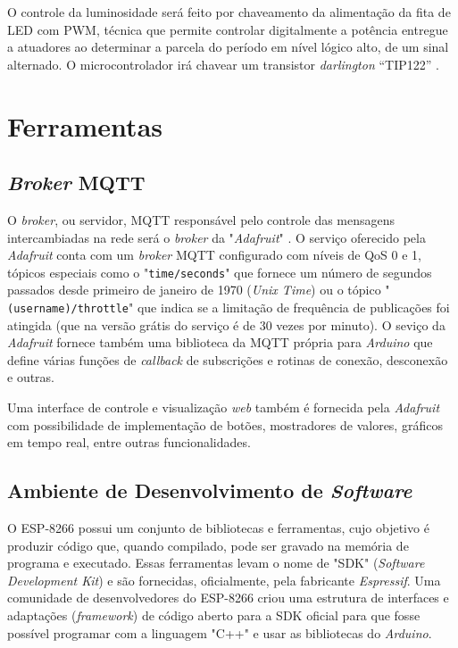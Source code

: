 O controle da luminosidade será feito por chaveamento da alimentação da fita de LED com \acf{PWM}, técnica que permite controlar digitalmente a potência entregue a atuadores ao determinar a parcela do período em nível lógico alto, de um sinal alternado. O microcontrolador irá chavear um transistor \textit{darlington} “TIP122” \cite{tip122}.

\section{Ferramentas}

\subsection{\textit{Broker} MQTT}

O \textit{broker}, ou servidor, MQTT responsável pelo controle das mensagens intercambiadas na rede será o \textit{broker} da "\textit{Adafruit}" \cite{adafruit}. O serviço oferecido pela \textit{Adafruit} conta com um  \textit{broker} MQTT configurado com níveis de QoS 0 e 1, tópicos especiais como o "\texttt{time/seconds}" que fornece um número de segundos passados desde primeiro de janeiro de 1970 (\textit{Unix Time}) ou o tópico "\texttt{(username)/throttle}" que indica se a limitação de frequência de publicações foi atingida (que na versão grátis do serviço é de 30 vezes por minuto). O seviço da \textit{Adafruit} fornece também uma biblioteca da MQTT própria para \textit{Arduino} que define várias funções de \textit{callback} de subscrições e rotinas de conexão, desconexão e outras.

Uma interface de controle e visualização \textit{web} também é fornecida pela \textit{Adafruit} com possibilidade de implementação de botões, mostradores de valores, gráficos em tempo real, entre outras funcionalidades.

\subsection{Ambiente de Desenvolvimento de \textit{Software}}

O ESP-8266 possui um conjunto de bibliotecas e ferramentas, cujo objetivo é produzir código que, quando compilado, pode ser gravado na memória de programa e executado. Essas ferramentas levam o nome de "SDK" (\textit{Software Development Kit}) e são fornecidas, oficialmente, pela fabricante \textit{Espressif}. Uma comunidade de desenvolvedores do ESP-8266 criou uma estrutura de interfaces e adaptações (\textit{framework}) de código aberto para a SDK oficial para que fosse possível programar com a linguagem "C++" e usar as bibliotecas do \textit{Arduino}.

